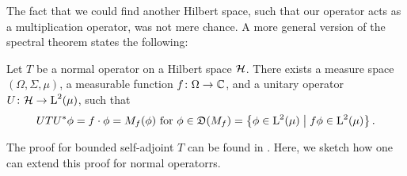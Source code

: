 The fact that we could find another Hilbert space, such that our operator
acts as a multiplication operator, was not mere chance. A more general 
version of the spectral theorem states the following:

\begin{thrm}

Let $T$ be a normal operator on a Hilbert space $\mathcal{H}$. There exists
a measure space $(\Omega, \Sigma, \mu)$, a measurable function 
$f\colon \Omega \to \mathbb{C}$, and a unitary operator $U\colon \mathcal{H} \to \text{L}^2(\mu)$,
such that
\[
UTU^{*} \phi = f \cdot \phi = M_f(\phi) \text{ for }\phi \in \mathfrak{D}(M_f) 
 = \left\lbrace \phi \in \text{L}^2(\mu) \bigm | f\phi \in \text{L}^2(\mu) \right\rbrace.
\]
\end{thrm}
The proof for bounded self-adjoint $T$ can be found in \cite[Ch. VII.1]{WernerFunkAna}.
Here, we sketch how one can extend this proof for normal operatorrs.


